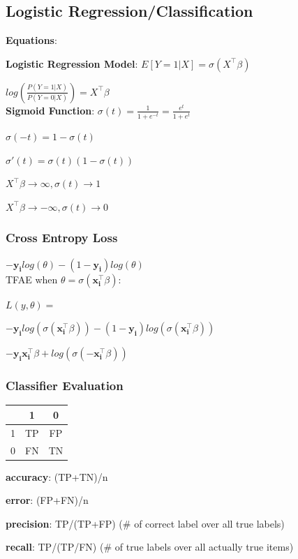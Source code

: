 \documentclass[8pt]{extarticle}
\begin{document}
\hline

\subsection*{Logistic Regression/Classification}
\textbf{Equations}:\par
\textbf{Logistic Regression Model}: $E[Y=1|X]=\sigma(X^\top \beta)$\par
$log(\frac{P(Y=1|X)}{P(Y=0|X)}) = X^\top \beta$ \\

\textbf{Sigmoid Function}: $\sigma(t)= \frac{1}{1+e^{-t}} = \frac{e^t}{1+e^t}$ \par
$\sigma(-t) = 1-\sigma(t)$ \par
$\sigma'(t) = \sigma(t)(1-\sigma(t))$ \par
$X^\top \beta \rightarrow \infty, \sigma(t)\rightarrow 1$\par
$X^\top \beta \rightarrow -\infty, \sigma(t)\rightarrow 0$ \par

\subsubsection*{Cross Entropy Loss}
$-\mathbf{y_i}log(\theta) - (1-\mathbf{y_i})log(\theta)$ \\

TFAE when $\theta = \sigma(\mathbf{x_i^\top}\beta) $: \par
$L(y, \theta) =$ \par
$-\mathbf{y_i}log(\sigma(\mathbf{x_i^\top}\beta)) - (1-\mathbf{y_i})log(\sigma(\mathbf{x_i^\top}\beta))$ \par
$-\mathbf{y_i}\mathbf{x_i^\top}\beta +log(\sigma(-\mathbf{x_i^\top}\beta))$ \par

\subsubsection*{Classifier Evaluation}
\begin{center}
\begin{tabular}{ |c| c |c| } 
\hline
  & 1 & 0 \\ 
 \hline
 1 & TP & FP \\  
 \hline
 0 & FN & TN \\
 \hline
\end{tabular}
\end{center}

\textbf{accuracy}: (TP+TN)/n \par
\textbf{error}: (FP+FN)/n \par
\textbf{precision}: TP/(TP+FP) (\# of correct label over all true labels) \par
\textbf{recall}: TP/(TP/FN) (\# of true labels over all actually true items) \par
\end{document}
